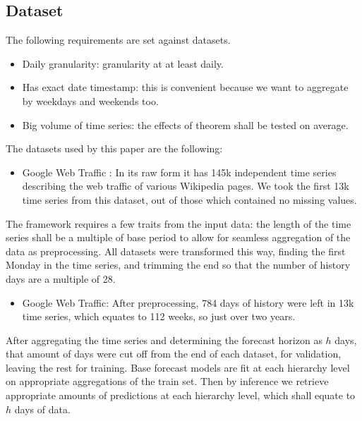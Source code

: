 \documentclass[sn-basic,Numbered,iicol]{sn-jnl}
\theoremstyle{thmstyleone}%
\theoremstyle{thmstyletwo}%
\theoremstyle{thmstylethree}%
\begin{document}
\subsection{Dataset}\label{subsec:dataset}

The following requirements are set against datasets.

\begin{itemize}
\item Daily granularity: granularity at at least daily.
\item Has exact date timestamp: this is convenient because we want to aggregate by weekdays and weekends too.
\item Big volume of time series: the effects of theorem shall be tested on average.
\end{itemize}

The datasets used by this paper are the following:

\begin{itemize}
\item Google Web Traffic \cite{kaggle_web_traffic_2017}: In its raw form it has 145k independent time series describing the web traffic of various Wikipedia pages. We took the first 13k time series from this dataset, out of those which contained no missing values.
\end{itemize}

The framework requires a few traits from the input data: the length of the time series shall be a multiple of base period to allow for seamless aggregation of the data as preprocessing. All datasets were transformed this way, finding the first Monday in the time series, and trimming the end so that the number of history days are a multiple of 28.

\begin{itemize}
\item Google Web Traffic: After preprocessing, 784 days of history were left in 13k time series, which equates to 112 weeks, so just over two years.
\end{itemize}

After aggregating the time series and determining the forecast horizon as $h$ days, that amount of days were cut off from the end of each dataset, for validation, leaving the rest for training. Base forecast models are fit at each hierarchy level on appropriate aggregations of the train set. Then by inference we retrieve appropriate amounts of predictions at each hierarchy level, which shall equate to $h$ days of data.
\end{document}
